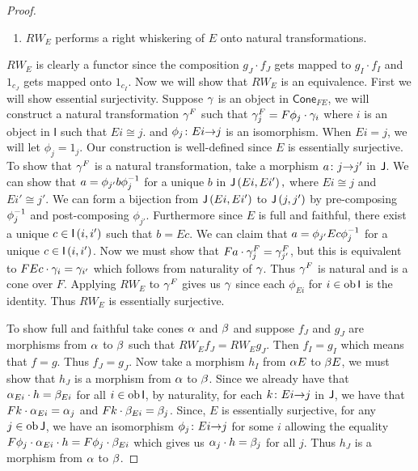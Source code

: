 \documentclass{article}
\begin{document}
\begin{proof}
\begin{enumerate}
			\item $RW_{E}$ performs a right whiskering of $E$ onto natural 
			transformations.
			
		\end{enumerate}
	    
	   $RW_{E}$ is clearly a functor since the composition $g_{J} \cdot f_{J}$ 
	   gets
	   mapped to $g_{I} \cdot f_{I}$ and $1_{c_{J}}$ gets mapped onto 
	   $1_{c_{I}}$. Now we will show that $RW_{E}$ is an equivalence. First we 
	   will show essential surjectivity. Suppose $\gamma$ is an object in 
	   $\mathsf{Cone}_{FE}$, we will construct a  natural transformation 
	   $\gamma^{F}$ such that $ \gamma^{F}_{j} = F\phi_{j} \cdot \gamma_{i}$ where $i$ 
	   is an object in $\mathsf{I}$ such that $Ei \cong j$. and 
	   ${\phi_{j}}\colon{Ei}{\to}{j}$ is an isomorphism. When $Ei = j$, we will let 
	   $\phi_{j} = 1_{j}$. Our construction is well-defined since $E$ is 
	   essentially surjective. To show that $\gamma^{F}$ is a natural 
	   transformation, take a morphism ${a}\colon{j}{\to}{j'}$ in $\mathsf{J}$. We can show 
	   that $a = \phi_{j'}b{\phi}^{-1}_{j}$ for a unique $b$ in $\mathsf{J}\left({Ei,Ei'}\right),$ 
	   where $Ei \cong j$ and $Ei' \cong j'.$ We can form a bijection from 	 
	   $\mathsf{J}\left({Ei,Ei'}\right)$ to $\mathsf{J}\left({j,j'}\right)$ by pre-composing ${\phi}^{-1}_{j}$ and 
	   post-composing $\phi_{j'}$. Furthermore since $E$ is full and faithful, 
	   there exist a 
	   unique $c \in \mathsf{I}\left({i,i'}\right)$ such that $b = Ec$. We can 
	   claim that $a = \phi_{j'}Ec{\phi}^{-1}_{j}$ for a unique $c \in 
	   \mathsf{I}\left({i,i'}\right)$. Now we must show that $Fa \cdot \gamma^{F}_{j} = 
	   \gamma_{j'}^{F}$, but this is equivalent to $FEc \cdot \gamma_{i} = \gamma_{i'}$ 
	   which follows from naturality of $\gamma$. Thus $\gamma^{F}$ is natural and is 
	   a cone over $F$. Applying $RW_{E}$ to $\gamma^{F}$ gives us $\gamma$ since 
	   each $\phi_{Ei}$ for $i \in \operatorname{ob}\mathsf{I}$ is the identity. Thus 
	   $RW_{E}$ is essentially surjective. 
	   
	   
	   To show full and faithful take cones $\alpha$ and $\beta$ and suppose $f_{J}$ 
	   and $g_{J}$ are morphisms from $\alpha$ to $\beta$ such that $RW_{E}f_{J} = 
	   RW_{E}g_{J}$. Then $f_{I} = g_{I}$ which means that $f = g$. Thus $f_{J} 
	   = g_{J}$. Now take a morphism $h_{I}$ from $\alpha E$ to $\beta E$, we must 
	   show that $h_{J}$ is a morphism from $\alpha$ to $\beta$. Since we already 
	   have that $\alpha_{Ei} \cdot h = \beta_{Ei}$ for all $i \in \operatorname{ob}\mathsf{I}$, 
	   by naturality, for each ${k}\colon{Ei}{\to}{j}$ in $\mathsf{J}$, we have that $Fk 
	   \cdot \alpha_{Ei} = \alpha_{j}$ and $Fk \cdot \beta_{Ei} = \beta_{j}$. Since, $E$ 
	   is essentially surjective, for any $j \in \operatorname{ob}\mathsf{J}$, we have an 
	   isomorphism ${\phi_{j}}\colon{Ei}{\to}{j}$ for some $i$ allowing the equality 
	   $F\phi_{j} \cdot \alpha_{Ei} \cdot h = F\phi_{j} \cdot \beta_{Ei}$ which 
	   gives us $\alpha_{j} \cdot h= \beta_{j}$ for all $j$. Thus $h_{J}$ is a 
	   morphism from $\alpha$ to $\beta$.
	   

\end{proof}
\end{document}
